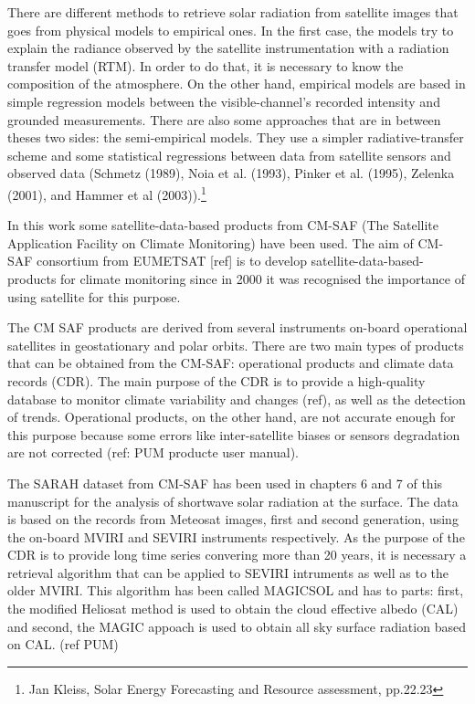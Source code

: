 There are different methods to retrieve solar radiation from satellite images that goes from physical models to empirical ones. In the first case, the models try to explain the radiance observed by the satellite instrumentation with a radiation transfer model (RTM). In order to do that, it is necessary to know the composition of the atmosphere. On the other hand, empirical models are based in simple regression models between the visible-channel's recorded intensity and grounded measurements. There are also some approaches that are in between theses two sides: the semi-empirical models. They use a simpler radiative-transfer scheme and some statistical regressions between data from satellite sensors and observed data (Schmetz (1989), Noia et al. (1993), Pinker et al. (1995), Zelenka (2001), and Hammer et al (2003)).\footnote{Jan Kleiss, Solar Energy Forecasting and Resource assessment, pp.22.23}

In this work some satellite-data-based products from CM-SAF (The Satellite Application Facility on Climate Monitoring) have been used. The aim of CM-SAF consortium from EUMETSAT [ref] is to develop satellite-data-based-products for climate monitoring since in 2000 it was recognised the importance of using satellite for this purpose.

The CM SAF products are derived from several instruments on-board operational satellites in geostationary and polar orbits. There are two main types of products that can be obtained from the CM-SAF: operational products and climate data records (CDR). The main purpose of the CDR is to provide a high-quality database to monitor climate variability and changes (ref), as well as the detection of trends. Operational products, on the other hand, are not accurate enough for this purpose because some errors like inter-satellite biases or sensors degradation are not corrected (ref: PUM producte user manual).


The SARAH dataset from CM-SAF has been used in chapters 6 and 7 of this manuscript for the analysis of shortwave solar radiation at the surface. The data is based on the records from Meteosat images, first and second generation, using the on-board MVIRI and SEVIRI instruments respectively. As the purpose of the CDR is to provide long time series convering more than 20 years, it is necessary a retrieval algorithm that can be applied to SEVIRI intruments as well as to the older MVIRI. This algorithm has been called MAGICSOL and has to parts: first, the modified Heliosat method is used to obtain the cloud effective albedo (CAL) and second, the MAGIC appoach is used to obtain all sky surface radiation based on CAL. (ref PUM)


